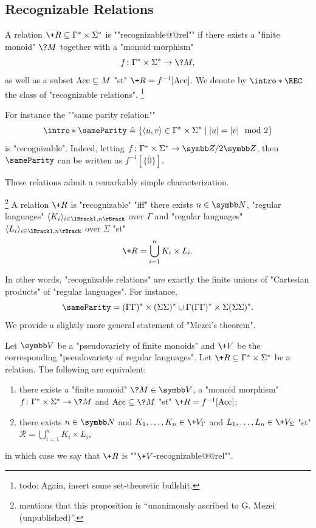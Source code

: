 \subsection{Recognizable Relations}

A relation $\+R \subseteq \Gamma^* \times \Sigma^*$ is \AP""recognizable@@rel""
if there exists a "finite monoid" $\?M$ together with a "monoid morphism"
\[
	f\colon \Gamma^* \times \Sigma^* \to \?M,
\]
as well as a subset $\textrm{Acc} \subseteq M$ "st"
$\+R = f^{-1}[\Acc]$. We denote by \AP$\intro*\REC$ the class of "recognizable relations".%
\footnote{todo: Again, insert some set-theoretic bullshit.}

For instance the \AP""same parity relation""
\[
	{\intro*\sameParity} \defeq 
	\{
		\tup{u,v} \in \Gamma^* \times \Sigma^* \mid
		|u| = |v| \mod{2}
	\}
\]
is "recognizable". Indeed, letting $f\colon  \Gamma^* \times \Sigma^* \to \ZnZ{2}$,
then $\sameParity$ can be written as $f^{-1}[\{\bar 0\}]$.

These relations admit a remarkably simple characterization.\AP
\begin{proposition}
	\!\footnote{\cite[\S~2, ``Notes \& references'']{Sakarovitch2009Elements} mentions
	that this proposition is ``unanimously ascribed to G. Mezei (unpublished)''.}
	\label{prop:Mezei-theorem}
	A relation $\+R$ is "recognizable" "iff" there exists $n\in\N$,
	"regular languages" $\tup{K_i}_{i\in \lBrack 1,n\rBrack}$ over $\Gamma$
	and "regular languages" $\tup{L_i}_{i\in \lBrack 1,n\rBrack}$ over $\Sigma$
	"st"
	\[
		\+R = \bigcup_{i=1}^n K_i \times L_i.
	\]
\end{proposition}

In other words, "recognizable relations" are exactly the finite unions of
"Cartesian products" of "regular languages".
For instance, \[{\sameParity} =
(\Gamma\Gamma)^* \times (\Sigma\Sigma)^*
\cup \Gamma(\Gamma\Gamma)^* \times \Sigma(\Sigma\Sigma)^*.\]
We provide a slightly more general statement of "Mezei's theorem".

\begin{proposition}
	\label{prop:Mezei-theorem-generalization}
	Let $\B{V}$ be a "pseudovariety of finite monoids"
	and $\+V$ be the corresponding "pseudovariety of regular languages".
	Let $\+R \subseteq \Gamma^* \times \Sigma^*$ be a relation.
	The following are equivalent:
	\begin{enumerate}
		\item there exists a "finite monoid" $\?M \in \B{V}$, a "monoid morphism"
		$f\colon \Gamma^* \times \Sigma^* \to \?M$ and $\Acc \subseteq \?M$
		"st" $\+R = f^{-1}[\Acc]$;
		\item there exists $n \in \N$
		and $K_1,\hdots,K_n \in \+V_{\Gamma}$ and $L_1,\hdots,L_n \in \+V_{\Sigma}$
		"st" $\mathcal{R} = \bigcup_{i=1}^n K_i \times L_i$,
	\end{enumerate}
	in which case we say that $\+R$ is \AP""$\+V$-recognizable@@rel"".
\end{proposition}


